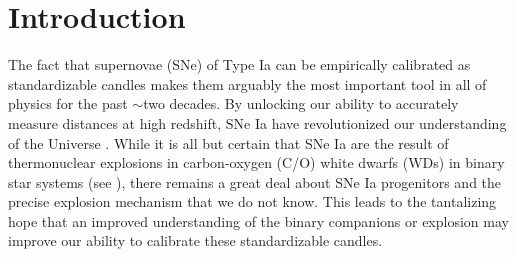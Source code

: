 \documentclass[twocolumn]{aastex63}
\begin{document}

\vspace{1em}

\section{Introduction}

The fact that supernovae (SNe) of Type Ia can be empirically calibrated as
standardizable candles makes them arguably the most important tool in all of
physics for the past $\sim$two decades. By unlocking our ability to accurately
measure distances at high redshift, SNe Ia have revolutionized our
understanding of the Universe \citep{Riess98,Perlmutter99}. While it is all
but certain that SNe Ia are the result of thermonuclear explosions in
carbon-oxygen (C/O) white dwarfs (WDs) in binary star systems (see
\citealt{Maoz14,Livio18}), there remains a great deal about SNe Ia progenitors
and the precise explosion mechanism that we do not know. This leads to the
tantalizing hope that an improved understanding of the binary companions or
explosion may improve our ability to calibrate these standardizable candles.
\end{document}
